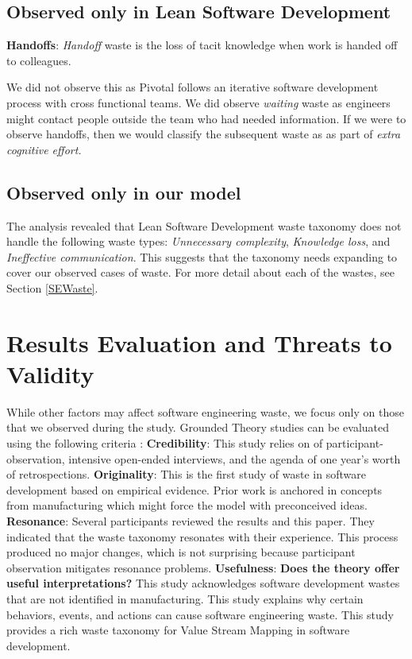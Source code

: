 \subsection{Observed only in Lean Software Development}


\textbf{Handoffs}: \textit{Handoff} waste is the loss of tacit knowledge when work is handed off to colleagues.


We did not observe this as Pivotal follows an iterative software development process with cross functional teams. We did observe \textit{waiting} waste as engineers might contact people outside the team who had needed information. If we were to observe handoffs, then we would classify the subsequent waste as  as part of \textit{extra cognitive effort.} 
\subsection{Observed only in our model}
The analysis revealed that Lean Software Development waste taxonomy does not handle the following waste types: \textit{Unnecessary complexity},  \textit{Knowledge loss},  and \textit{Ineffective communication}. This suggests that the taxonomy needs expanding to cover our observed cases of waste. For more detail about each of the wastes, see Section \ref{SEWaste}.
\section{Results Evaluation and Threats to Validity}
\label{ResultsEvaluation}
While other factors may affect software engineering waste, we focus only on those that we observed during the study. Grounded Theory studies can be evaluated using the following criteria \cite{Charmaz, StolGroundedTheory}:
\textbf{Credibility}:   This study relies on \durationOfResearchStudyPlural{} of participant-observation, \numberOfInterviews{} intensive open-ended interviews, and the agenda of one year's worth of retrospections. 
\textbf{Originality}:   This is the first study of waste in software development based on empirical evidence. Prior work is anchored in concepts from manufacturing which might force the model with preconceived ideas. 
\textbf{Resonance}:  Several participants reviewed the results and this paper. They indicated that the waste taxonomy resonates with their experience.    This process produced no major changes, which is not surprising because participant observation mitigates resonance problems.
\textbf{Usefulness}: \textbf{Does the theory offer useful interpretations?} This study acknowledges software development wastes that are not identified in manufacturing. This study explains why certain behaviors, events, and actions can cause software engineering waste. This study provides a rich waste taxonomy for Value Stream Mapping in software development. 


